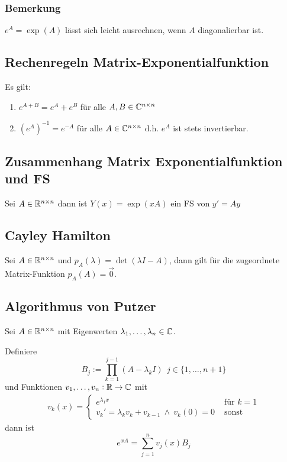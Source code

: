\subsubsection{Bemerkung}
$e^A = \exp(A)$ lässt sich leicht ausrechnen, wenn $A$ diagonalierbar ist.

\subsection{Rechenregeln Matrix-Exponentialfunktion}
Es gilt:
\begin{enumerate}[label= (\alph*)]
	\item $e^{A+B} = e^A + e^B$ für alle $A,B \in \mathbb{C}^{n \times n}$
	\item ${(e^A)}^{-1} = e^{-A}$ für alle $A \in \mathbb{C}^{n \times n}$
		d.h. $e^A$ ist stets invertierbar. 
\end{enumerate}

\subsection{Zusammenhang Matrix Exponentialfunktion und FS}
Sei $A \in \mathbb{R}^{n \times n}$ dann ist $Y(x) = \exp{(x A)}$ ein FS von $y' = Ay$

\subsection{Cayley Hamilton}
Sei $A \in \mathbb{R}^{n \times n}$ und $p_A(\lambda) = \det(\lambda I - A)$, dann gilt für die zugeordnete Matrix-Funktion $p_A(A) = \vec{0}$.

\subsection{Algorithmus von Putzer}
Sei $A \in \mathbb{R}^{n \times n}$ mit Eigenwerten $\lambda_1, \ldots, \lambda_n \in \mathbb{C}$.

Definiere
\begin{equation*}
	B_j := \prod_{k=1}^{j-1} (A - \lambda_k I)\ \ j\in\{1, \ldots, n+1\}
\end{equation*}
und Funktionen $v_1, \ldots, v_n: \mathbb{R} \to \mathbb{C}$ mit
\begin{eqnarray*}
	v_k(x) = \begin{cases}
		e^{\lambda_1 x} & \text{ für } k = 1 \\
		v_k' = \lambda_k v_k + v_{k-1}\ \land\ v_k(0) = 0 &
		\text{ sonst}
	\end{cases}
\end{eqnarray*}
dann ist
\begin{equation*}
	e^{xA} = \sum_{j=1}^n v_j(x) B_j
\end{equation*}

